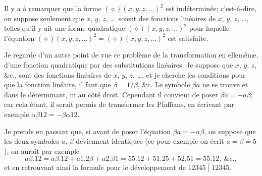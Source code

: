 \documentclass[11pt,a4paper]{article}
\begin{document}
\medskip

Il y a \`a remarquer que la forme $(\diamond)(x,y,z,\ldots)^2$ est ind\'etermin\'ee; c'est-\`a-dire, on suppose seulement que $x$, $y$, $z$, \ldots\ soient des fonctions lin\'eaires de $x$, $y$, $z$, \ldots, telles qu'il y ait une forme quadratique $(\diamond)(x,y,z,\ldots)^2$ pour laquelle l'\'equation $(\diamond)(x,y,z,\ldots)^2 = (\diamond)(x,y,z,\ldots)^2$ est satisfaite.

\medskip

Je regarde d'un autre point de vue ce probl\`eme de la transformation en ellem\^eme, d'une fonction quadratique par des substitutions lin\'eaires. Je suppose que $x$, $y$, $z$, \&c., sont des fonctions lin\'eaires de $x$, $y$, $z$, \ldots, et je cherche les conditions pour que la fonction lin\'eaire, il faut que $\beta = 1/\beta$, \&c. Le symbole $\beta a$ ne se trouve et dans le d\'eterminant, ni au c\^ot\'e droit. Cependant il convient de poser $\beta a = -a\beta$; car cela \'etant, il serait permis de transformer les Pfaffians, en \'ecrivant par exemple $\alpha\beta 12 = -\beta\alpha 12$.

\medskip

Je prends en passant que, si avant de poser l'\'equation $\beta a = -\alpha\beta$, on suppose que les deux symboles $a$, $\beta$ deviennent identiques (ce pour exemple on \'ecrit $a = \beta = 5$), on aurait par exemple
\[
a\beta . 12 = a\beta . 12 + a 1 . 2\beta + a 2 . \beta 1 = 55 . 12 + 51 . 25 + 52 . 51 = 55 . 12,\ \&\mathrm{c}.,
\]
et en retrouvant ainsi la formule pour le d\'eveloppement de $\overline{12345 \mid 12345}$.

\medskip
\end{document}
